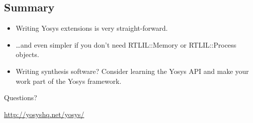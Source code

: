 
\subsection{Summary}

\begin{frame}{\subsecname}
\begin{itemize}
\item Writing Yosys extensions is very straight-forward.
\item \dots and even simpler if you don't need RTLIL::Memory or RTLIL::Process objects.

\bigskip
\item Writing synthesis software? Consider learning the Yosys API and make your work
part of the Yosys framework.
\end{itemize}

\bigskip
\bigskip
\begin{center}
Questions?
\end{center}

\bigskip
\bigskip
\begin{center}
\url{http://yosyshq.net/yosys/}
\end{center}
\end{frame}

